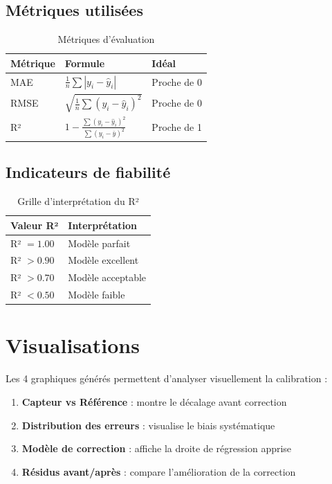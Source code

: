 \documentclass[12pt, a4paper]{article}
\begin{document}
\subsection{Métriques utilisées}

\begin{table}[H]
    \centering
    \caption{Métriques d'évaluation}
    \begin{tabular}{@{}lll@{}}
        \toprule
        \textbf{Métrique} & \textbf{Formule} & \textbf{Idéal} \\
        \midrule
        MAE  & $\frac{1}{n}\sum|y_i - \hat{y}_i|$ & Proche de 0 \\
        RMSE & $\sqrt{\frac{1}{n}\sum(y_i - \hat{y}_i)^2}$ & Proche de 0 \\
        R²   & $1 - \frac{\sum(y_i-\hat{y}_i)^2}{\sum(y_i-\bar{y})^2}$ & Proche de 1 \\
        \bottomrule
    \end{tabular}
\end{table}

\subsection{Indicateurs de fiabilité}

\begin{table}[H]
    \centering
    \caption{Grille d'interprétation du R²}
    \begin{tabular}{@{}ll@{}}
        \toprule
        \textbf{Valeur R²} & \textbf{Interprétation} \\
        \midrule
        R² $= 1.00$ & Modèle parfait \\
        R² $> 0.90$ & Modèle excellent \\
        R² $> 0.70$ & Modèle acceptable \\
        R² $< 0.50$ & Modèle faible \\
        \bottomrule
    \end{tabular}
\end{table}

\section{Visualisations}

Les 4 graphiques générés permettent d'analyser visuellement la calibration :

\begin{enumerate}
    \item \textbf{Capteur vs Référence} : montre le décalage avant correction
    \item \textbf{Distribution des erreurs} : visualise le biais systématique
    \item \textbf{Modèle de correction} : affiche la droite de régression apprise
    \item \textbf{Résidus avant/après} : compare l'amélioration de la correction
\end{enumerate}
\end{document}
